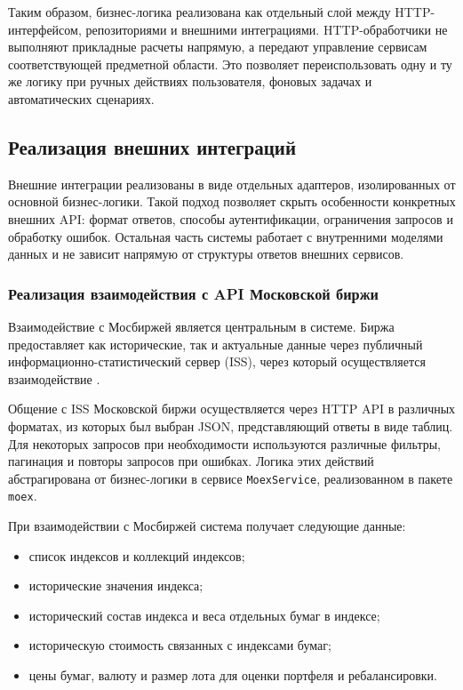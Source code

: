 \documentclass[14pt]{gost-7-32}
\begin{document}
Таким образом, бизнес-логика реализована как отдельный слой между HTTP-интерфейсом, репозиториями и внешними интеграциями. HTTP-обработчики не выполняют прикладные расчеты напрямую, а передают управление сервисам соответствующей предметной области. Это позволяет переиспользовать одну и ту же логику при ручных действиях пользователя, фоновых задачах и автоматических сценариях.

\subsection{Реализация внешних интеграций}

Внешние интеграции реализованы в виде отдельных адаптеров, изолированных от основной бизнес-логики. Такой подход позволяет скрыть особенности конкретных внешних API: формат ответов, способы аутентификации, ограничения запросов и обработку ошибок. Остальная часть системы работает с внутренними моделями данных и не зависит напрямую от структуры ответов внешних сервисов.


\subsubsection{Реализация взаимодействия с API Московской биржи}
\label{sec:impl-moex-api}

Взаимодействие с Мосбиржей является центральным в системе. Биржа предоставляет как исторические, так и актуальные данные через публичный информационно-статистический сервер (ISS), через который осуществляется взаимодействие \cite{moexIssReference}.

Общение с ISS Московской биржи осуществляется через HTTP API в различных форматах, из которых был выбран JSON, представляющий ответы в виде таблиц. Для некоторых запросов при необходимости используются различные фильтры, пагинация и повторы запросов при ошибках. Логика этих действий абстрагирована от бизнес-логики в сервисе \verb|MoexService|, реализованном в пакете \verb|moex|.

При взаимодействии с Мосбиржей система получает следующие данные:

\begin{itemize}
  \item список индексов и коллекций индексов;
  \item исторические значения индекса;
  \item исторический состав индекса и веса отдельных бумаг в индексе;
  \item историческую стоимость связанных с индексами бумаг;
  \item цены бумаг, валюту и размер лота для оценки портфеля и ребалансировки.
\end{itemize}
\end{document}
